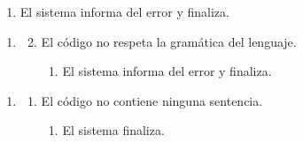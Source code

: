 \begin{framed}
\begin{description}
\begin{enumerate}
\begin {enumerate}
         \begin{enumerate}
         \item El sistema informa del error y finaliza.
         \end{enumerate}
      \end{enumerate}
   \end{enumerate}
   \begin{enumerate} \itemsep1pt \parskip0pt 
   \setcounter{enumi}{0}
   \renewcommand{\labelenumi}{}
   \renewcommand{\labelenumiii}{\arabic{enumiii}.}
   \renewcommand{\labelenumii}{\arabic{enumi}\alph{enumii}.}
      \item 
      \begin {enumerate}
         \setcounter{enumii}{1}
         \item El código no respeta la gramática del lenguaje.
         \begin{enumerate}
         \item El sistema informa del error y finaliza.
         \end{enumerate}
      \end{enumerate}
   \end{enumerate}
   \begin{enumerate} \itemsep1pt \parskip0pt 
   \setcounter{enumi}{1}
   \renewcommand{\labelenumi}{}
   \renewcommand{\labelenumiii}{\arabic{enumiii}.}
   \renewcommand{\labelenumii}{\arabic{enumi}\alph{enumii}.}
      \item 
      \begin {enumerate}
         \setcounter{enumii}{0}
         \item El código no contiene ninguna sentencia.
         \begin{enumerate}
         \item El sistema finaliza.
         \end{enumerate}
      \end{enumerate}
   \end{enumerate}
\end{description}
 \FloatBarrier
\end{framed}
